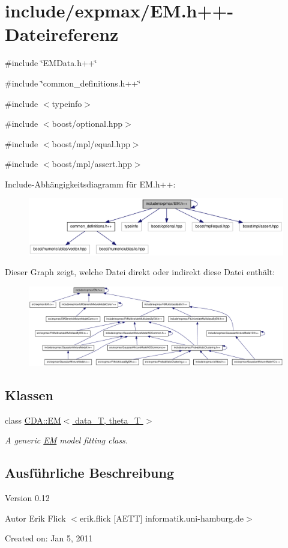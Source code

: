 \hypertarget{EM_8h_09_09}{
\section{include/expmax/EM.h++-\/Dateireferenz}
\label{EM_8h_09_09}
}
{\ttfamily \#include \char`\"{}EMData.h++\char`\"{}}\par
{\ttfamily \#include \char`\"{}common\_\-definitions.h++\char`\"{}}\par
{\ttfamily \#include $<$typeinfo$>$}\par
{\ttfamily \#include $<$boost/optional.hpp$>$}\par
{\ttfamily \#include $<$boost/mpl/equal.hpp$>$}\par
{\ttfamily \#include $<$boost/mpl/assert.hpp$>$}\par
Include-\/Abhängigkeitsdiagramm für EM.h++:\nopagebreak
\begin{figure}[H]
\begin{center}
\leavevmode
\includegraphics[width=345pt]{EM_8h_09_09__incl}
\end{center}
\end{figure}
Dieser Graph zeigt, welche Datei direkt oder indirekt diese Datei enthält:\nopagebreak
\begin{figure}[H]
\begin{center}
\leavevmode
\includegraphics[width=420pt]{EM_8h_09_09__dep__incl}
\end{center}
\end{figure}
\subsection*{Klassen}
\begin{DoxyCompactItemize}
\item 
class \hyperlink{classCDA_1_1EM}{CDA::EM$<$ data\_\-T, theta\_\-T $>$}
\begin{DoxyCompactList}\small\item\em A generic \hyperlink{classCDA_1_1EM}{EM} model fitting class. \item\end{DoxyCompactList}\end{DoxyCompactItemize}


\subsection{Ausführliche Beschreibung}
\begin{DoxyVersion}{Version}
0.12 
\end{DoxyVersion}
\begin{DoxyAuthor}{Autor}
Erik Flick $<$erik.flick \mbox{[}AETT\mbox{]} informatik.uni-\/hamburg.de$>$
\end{DoxyAuthor}
Created on: Jan 5, 2011 